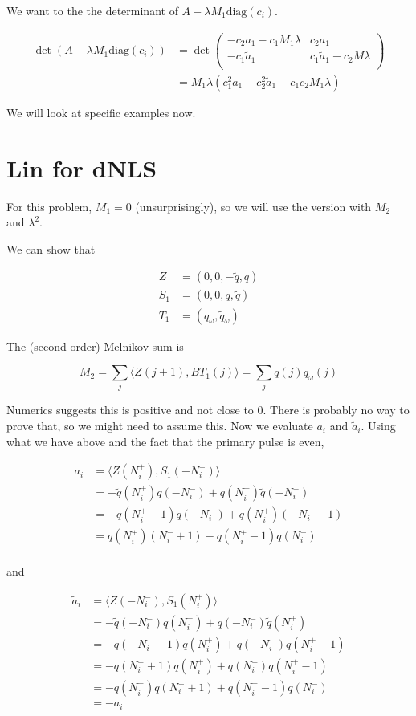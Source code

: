 \documentclass[12pt]{article}
\begin{document}
We want to the the determinant of $A - \lambda M_1 \text{diag}(c_i)$.

\begin{align*}
\det( A - \lambda M_1 \text{diag}(c_i)) &= \det \begin{pmatrix}
-c_2 a_1 - c_1 M_1 \lambda & c_2 a_1 \\
-c_1 \tilde{a}_1 & c_1 \tilde{a}_1 - c_2 M \lambda \\
\end{pmatrix} \\
&= M_1 \lambda ( c_1^2 a_1 - c_2^2 \tilde{a}_1 + c_1 c_2 M_1 \lambda )
\end{align*}

We will look at specific examples now.


\section*{Lin for dNLS}

For this problem, $M_1 = 0$ (unsurprisingly), so we will use the version with $M_2$ and $\lambda^2$.

We can show that

\begin{align*}
Z &= (0, 0, -\tilde{q}, q) \\
S_1 &= (0, 0, q, \tilde{q}) \\
T_1 &= (q_\omega, \tilde{q}_\omega)
\end{align*}

The (second order) Melnikov sum is

\[
M_2 = \sum_j \langle Z(j+1), B T_1(j) \rangle = \sum_j q(j) q_\omega(j)
\]

Numerics suggests this is positive and not close to 0. There is probably no way to prove that, so we might need to assume this. Now we evaluate $a_i$ and $\tilde{a}_i$. Using what we have above and the fact that the primary pulse is even,

\begin{align*}
a_i &= \langle Z(N_i^+), S_1(-N_i^-) \rangle \\
&= -\tilde{q}(N_i^+)q(-N_i^-) + q(N_i^+)\tilde{q}(-N_i^-) \\
&= -q(N_i^+ - 1)q(-N_i^-) + q(N_i^+)(-N_i^- - 1) \\
&= q(N_i^+)(N_i^- + 1) - q(N_i^+ - 1)q(N_i^-)\\
\end{align*}

and

\begin{align*}
\tilde{a}_i &= \langle Z(-N_i^-), S_1(N_i^+) \rangle \\
&= -\tilde{q}(-N_i^-)q(N_i^+) + q(-N_i^-)\tilde{q}(N_i^+) \\
&= -q(-N_i^- - 1)q(N_i^+) + q(-N_i^-)q(N_i^+ - 1) \\
&= -q(N_i^- + 1)q(N_i^+) + q(N_i^-)q(N_i^+ - 1) \\
&= -q(N_i^+)q(N_i^- + 1) + q(N_i^+ - 1)q(N_i^-) \\
&= -a_i
\end{align*}
\end{document}
